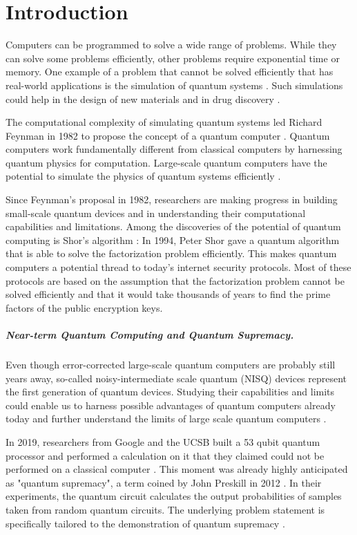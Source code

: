 \chapter{Introduction}

Computers can be programmed to solve a wide range of problems.
While they can solve some problems efficiently, 
other problems require exponential time or memory. One example of 
a problem that cannot be solved efficiently that has real-world 
applications is the simulation of quantum systems \cite{nielsen2002quantum}.  
Such simulations could help in the design 
of new materials and in drug discovery \cite{8585034}.

The computational complexity of simulating quantum systems led 
Richard Feynman in 1982 to propose the concept of a quantum computer \cite{feynman1982simulating}. Quantum 
computers work fundamentally different from classical computers by 
harnessing quantum physics for computation. Large-scale quantum computers have the potential
to simulate the physics of quantum systems efficiently \cite{Zalka_1998}.

Since Feynman's proposal in 1982, researchers are making progress in building small-scale 
quantum devices and in understanding their computational capabilities and limitations.
Among the discoveries of the potential of quantum computing is Shor's algorithm \cite{shor1997factorisation}: 
In 1994, Peter Shor gave a quantum algorithm that is able to solve the 
factorization problem efficiently. This makes quantum computers a potential thread to 
today's internet security protocols. Most of these protocols are based on the assumption 
that the factorization problem cannot be solved efficiently and that it would take thousands of years to find the 
prime factors of the public encryption keys.

\paragraph{Near-term Quantum Computing and Quantum Supremacy.}
Even though error-corrected large-scale quantum computers are probably still 
years away, so-called noisy-intermediate scale 
quantum (NISQ) devices represent the first generation of quantum devices.
Studying their capabilities and limits could enable us to harness possible advantages 
of quantum computers already today and further understand the limits of 
large scale quantum computers \cite{Preskill_2018}.

In 2019, researchers from Google and the UCSB built a 
53 qubit quantum processor and performed a calculation on it that they claimed could not be 
performed on a classical computer \cite{martines2019supremacy}. This moment was already highly anticipated 
as "quantum supremacy", a term coined by John Preskill in 2012 \cite{preskill2012quantum}. In their experiments, 
the quantum circuit calculates the output probabilities of samples taken from 
random quantum circuits. The underlying problem statement is specifically tailored 
to the demonstration of quantum supremacy \cite{Boixo2018supremacy}.

